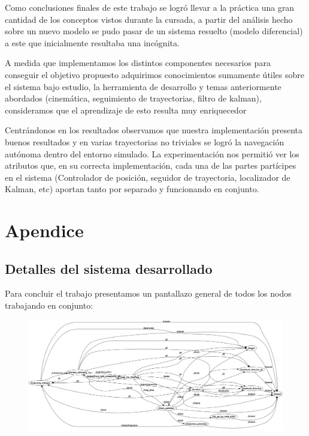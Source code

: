 Como conclusiones finales de este trabajo se logró llevar a la práctica una gran cantidad de los conceptos vistos durante la cursada, a partir del análisis hecho sobre un nuevo modelo se pudo pasar de un sistema resuelto (modelo diferencial) a este que inicialmente resultaba una incógnita. 

A medida que implementamos los distintos componentes necesarios para conseguir el objetivo propuesto adquirimos conocimientos sumamente útiles sobre el sistema bajo estudio, la herramienta de desarrollo y temas anteriormente abordados (cinemática, seguimiento de trayectorias, filtro de kalman), consideramos que el aprendizaje de esto resulta muy enriquecedor 

Centrándonos en los resultados observamos que nuestra implementación presenta buenos resultados y en varias trayectorias no triviales se logró la navegación autónoma dentro del entorno simulado. La experimentación nos permitió ver los atributos que, en su correcta implementación, cada una de las partes partícipes en el sistema (Controlador de posición, seguidor de trayectoria, localizador de Kalman, etc) aportan tanto por separado y funcionando en conjunto.


\section{Apendice}

\subsection{Detalles del sistema desarrollado}

Para concluir el trabajo presentamos un pantallazo general de todos los nodos trabajando en conjunto:

\begin{figure}[!htb]
\begin{center}
\includegraphics[width=\linewidth]{rqtgraphekf.png} 
\end{center}
\end{figure}

